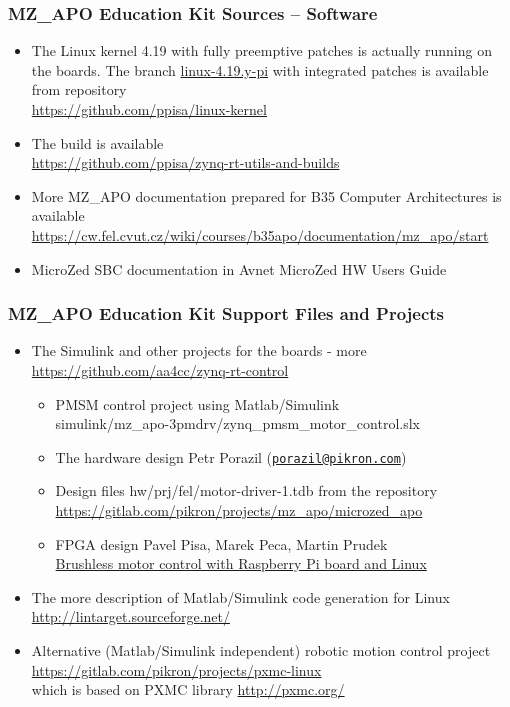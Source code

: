 \documentclass{beamer}
\begin{document}
\begin{frame}
\frametitle{MZ\_APO Education Kit Sources -- Software}

\begin{itemize}
\item The Linux kernel 4.19 with fully preemptive patches is actually
  running on the boards. The branch
  \href{https://github.com/ppisa/linux-kernel/commits/linux-4.19.y-pi}{linux-4.19.y-pi}
  with integrated patches is available from repository \\
  \url{https://github.com/ppisa/linux-kernel}
\item
  The build is available \\
  \url{https://github.com/ppisa/zynq-rt-utils-and-builds}
\item
  More MZ\_APO documentation prepared for B35 Computer Architectures is
  available \\
  \url{https://cw.fel.cvut.cz/wiki/courses/b35apo/documentation/mz_apo/start}
\item
  MicroZed SBC documentation in Avnet MicroZed HW Users Guide
\end{itemize}

\end{frame}


\begin{frame}
\frametitle{MZ\_APO Education Kit Support Files and Projects}

\begin{itemize}
\item The Simulink and other projects for the boards - more \\
      \url{https://github.com/aa4cc/zynq-rt-control}
\begin{itemize}
\item PMSM control project using Matlab/Simulink \\
      simulink/mz\_apo-3pmdrv/zynq\_pmsm\_motor\_control.slx
\item The hardware design Petr Porazil
  (\href{mailto:porazil@pikron.com}{\nolinkurl{porazil@pikron.com}})
\item Design files hw/prj/fel/motor-driver-1.tdb from the repository \\
  \url{https://gitlab.com/pikron/projects/mz_apo/microzed_apo}
\item FPGA design Pavel Pisa, Marek Peca, Martin Prudek \\
  \href{https://dspace.cvut.cz/bitstream/handle/10467/62036/F3-BP-2015-Prudek-Martin-Bp_2015_prudek_martin.pdf}{Brushless motor control with Raspberry Pi board and Linux}
\end{itemize}
\item The more description of Matlab/Simulink code generation for Linux \\
  \url{http://lintarget.sourceforge.net/}
\item Alternative (Matlab/Simulink independent) robotic motion control project \\
  \url{https://gitlab.com/pikron/projects/pxmc-linux} \\
  which is based on PXMC library \url{http://pxmc.org/}
\end{itemize}

\end{frame}
\end{document}
